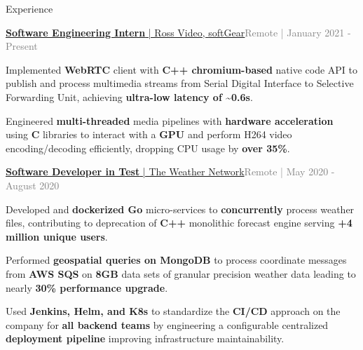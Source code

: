 \documentclass[hidelinks]{resume} %
\begin{document}
\begin{rSection}{Experience}
\begin{rSubsection}{\href{https://www.rossvideo.com/products-services/infrastructure/softgear-software-based-signal-processing-platform/}{\textbf{Software Engineering Intern}{ | Ross Video, \underline{softGear}}}}{\textcolor{gray}{Remote | January 2021 - Present}}{}

    \begin{bulletpoints}
        \vspace{-.10cm}
        \item Implemented \textbf{WebRTC} client with \textbf{C++ chromium-based} native code API to publish and process multimedia streams from Serial Digital Interface to Selective Forwarding Unit, achieving \textbf{ultra-low latency of \textasciitilde0.6s}.
        \vspace{-.13cm}
        \item Engineered \textbf{multi-threaded} media pipelines with \textbf{hardware acceleration} using \textbf{C} libraries to interact with a \textbf{GPU} and perform H264 video encoding/decoding efficiently, dropping CPU usage by \textbf{over 35\%}.
        \vspace{-.10cm}
    \end{bulletpoints}
    \vspace{-.25cm}
\end{rSubsection}
\begin{rSubsection}{\href{https://www.theweathernetwork.com/}{\textbf{Software Developer in Test}{ | The Weather Network}}}{\textcolor{gray}{Remote | May 2020 - August 2020}}{}
        \par
        \begin{bulletpoints}
            \vspace{-.10cm}
            \item Developed and \textbf{dockerized Go} micro-services to \textbf{concurrently} process weather files, contributing to deprecation of \textbf{C++} monolithic forecast engine serving \textbf{+4 million unique users}.
             \vspace{-.13cm}
            \item Performed \textbf{geospatial queries on MongoDB} to process coordinate messages from \textbf{AWS SQS} on \textbf{8GB} data sets of granular precision weather data leading to nearly \textbf{30\% performance upgrade}.
            \vspace{-.13cm}
             \item Used \textbf{Jenkins, Helm, and K8s} to standardize the \textbf{CI/CD} approach on the company for \textbf{all backend teams} by engineering a configurable centralized \textbf{deployment pipeline} improving infrastructure maintainability.

\end{bulletpoints}
\end{rSubsection}
\end{rSection}
\end{document}
